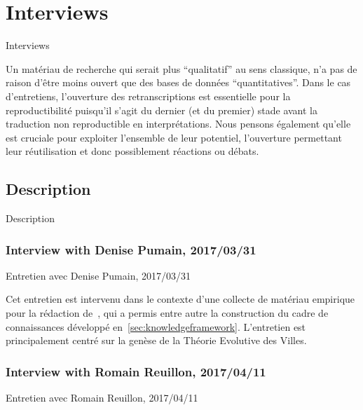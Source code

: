 




\section{Interviews}{Interviews}

\label{app:sec:interviews}


Un matériau de recherche qui serait plus ``qualitatif'' au sens classique, n'a pas de raison d'être moins ouvert que des bases de données ``quantitatives''. Dans le cas d'entretiens, l'ouverture des retranscriptions est essentielle pour la reproductibilité puisqu'il s'agit du dernier (et du premier) stade avant la traduction non reproductible en interprétations. Nous pensons également qu'elle est cruciale pour exploiter l'ensemble de leur potentiel, l'ouverture permettant leur réutilisation et donc possiblement réactions ou débats.


\subsection{Description}{Description}

\subsubsection{Interview with Denise Pumain, 2017/03/31}{Entretien avec Denise Pumain, 2017/03/31}

Cet entretien est intervenu dans le contexte d'une collecte de matériau empirique pour la rédaction de~\cite{raimbault2017applied}, qui a permis entre autre la construction du cadre de connaissances développé en~\ref{sec:knowledgeframework}. L'entretien est principalement centré sur la genèse de la Théorie Evolutive des Villes.

\subsubsection{Interview with Romain Reuillon, 2017/04/11}{Entretien avec Romain Reuillon, 2017/04/11}

